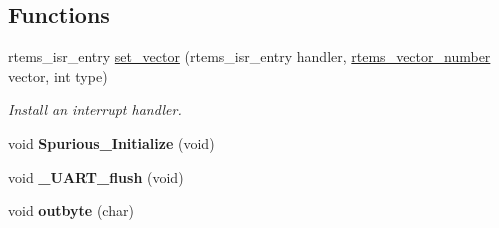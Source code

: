 \subsection*{Functions}
\begin{DoxyCompactItemize}
\item 
rtems\+\_\+isr\+\_\+entry \mbox{\hyperlink{group__RTEMSBSPsM68kMRM332_gab3388042c56b34c40be81fd5f028d97e}{set\+\_\+vector}} (rtems\+\_\+isr\+\_\+entry handler, \mbox{\hyperlink{group__ClassicINTR_ga3e434c197d99f128e78cae4d9358bd8b}{rtems\+\_\+vector\+\_\+number}} vector, int type)
\begin{DoxyCompactList}\small\item\em Install an interrupt handler. \end{DoxyCompactList}\item 
\mbox{\label{group__RTEMSBSPsM68kMRM332_ga86b4b35b8f8f039670f34b9fdb980114}} 
void {\bfseries Spurious\+\_\+\+Initialize} (void)
\item 
\mbox{\label{group__RTEMSBSPsM68kMRM332_ga8fd2a97d5a8140e74ba5fdd42ddba7b9}} 
void {\bfseries \+\_\+\+U\+A\+R\+T\+\_\+flush} (void)
\item 
\mbox{\label{group__RTEMSBSPsM68kMRM332_ga6b36b1f2a59a7b0c351c2c377f32757a}} 
void {\bfseries outbyte} (char)
\end{DoxyCompactItemize}
